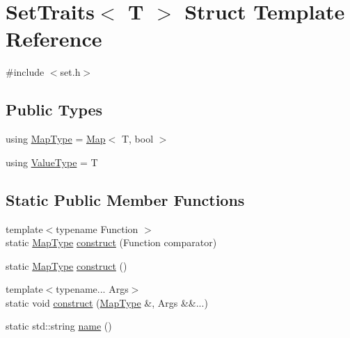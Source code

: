 \hypertarget{structstanfordcpplib_1_1collections_1_1SetTraits}{}\section{Set\+Traits$<$ T $>$ Struct Template Reference}
\label{structstanfordcpplib_1_1collections_1_1SetTraits}


{\ttfamily \#include $<$set.\+h$>$}

\subsection*{Public Types}
\begin{DoxyCompactItemize}
\item 
using \mbox{\hyperlink{structstanfordcpplib_1_1collections_1_1SetTraits_afa45c53052622da3c2a6412797d43cce}{Map\+Type}} = \mbox{\hyperlink{classMap}{Map}}$<$ T, bool $>$
\item 
using \mbox{\hyperlink{structstanfordcpplib_1_1collections_1_1SetTraits_aecaeabaa9da616ae42bb20787878260d}{Value\+Type}} = T
\end{DoxyCompactItemize}
\subsection*{Static Public Member Functions}
\begin{DoxyCompactItemize}
\item 
{\footnotesize template$<$typename Function $>$ }\\static \mbox{\hyperlink{structstanfordcpplib_1_1collections_1_1SetTraits_afa45c53052622da3c2a6412797d43cce}{Map\+Type}} \mbox{\hyperlink{structstanfordcpplib_1_1collections_1_1SetTraits_a0fcfe2a368d6e9d07629e9df4e0af601}{construct}} (Function comparator)
\item 
static \mbox{\hyperlink{structstanfordcpplib_1_1collections_1_1SetTraits_afa45c53052622da3c2a6412797d43cce}{Map\+Type}} \mbox{\hyperlink{structstanfordcpplib_1_1collections_1_1SetTraits_ac811d1b6f02a0a95b10438adb8c41345}{construct}} ()
\item 
{\footnotesize template$<$typename... Args$>$ }\\static void \mbox{\hyperlink{structstanfordcpplib_1_1collections_1_1SetTraits_acf316ffce53757ed1acdda05ee4e31b5}{construct}} (\mbox{\hyperlink{structstanfordcpplib_1_1collections_1_1SetTraits_afa45c53052622da3c2a6412797d43cce}{Map\+Type}} \&, Args \&\&...)
\item 
static std\+::string \mbox{\hyperlink{structstanfordcpplib_1_1collections_1_1SetTraits_a7fb46594d295b98500539251135502bc}{name}} ()
\end{DoxyCompactItemize}


